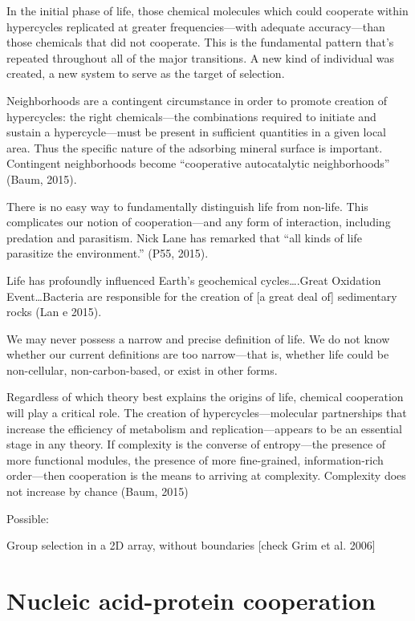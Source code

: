 \documentclass{tufte-book} %
\begin{document}
In the initial phase of life, those chemical molecules which could cooperate within hypercycles replicated at greater frequencies—with adequate accuracy—than those chemicals that did not cooperate. This is the fundamental pattern that’s repeated throughout all of the major transitions. A new kind of individual was created, a new system to serve as the target of selection. 

Neighborhoods are a contingent circumstance in order to promote creation of hypercycles: the right chemicals—the combinations required to initiate and sustain a hypercycle—must be present in sufficient quantities in a given local area. Thus the specific nature of the adsorbing mineral surface is important. Contingent neighborhoods become “cooperative autocatalytic neighborhoods” (Baum, 2015). 

There is no easy way to fundamentally distinguish life from non-life. This complicates our notion of cooperation—and any form of interaction, including predation and parasitism. Nick Lane has remarked that “all kinds of life parasitize the environment.” (P55, 2015).

Life has profoundly influenced Earth’s geochemical cycles….Great Oxidation Event…Bacteria are responsible for the creation of [a great deal of] sedimentary rocks (Lan	e 2015). 

We may never possess a narrow and precise definition of life. We do not know whether our current definitions are too narrow—that is, whether life could be non-cellular, non-carbon-based, or exist in other forms. 

Regardless of which theory best explains the origins of life, chemical cooperation will play a critical role. The creation of hypercycles—molecular partnerships that increase the efficiency of metabolism and replication—appears to be an essential stage in any theory. If complexity is the converse of entropy—the presence of more functional modules, the presence of more fine-grained, information-rich order—then cooperation is the means to arriving at complexity. Complexity does not increase by chance (Baum, 2015)

Possible: 

Group selection in a 2D array, without boundaries [check Grim et al. 2006]

\section{Nucleic acid-protein cooperation}
\end{document}
